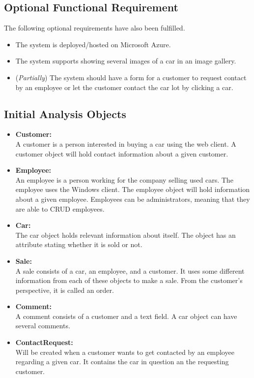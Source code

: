 \subsection{Optional Functional Requirement}
The following optional requirements have also been fulfilled.
\begin{itemize}
	\item The system is deployed/hosted on Microsoft Azure.
	\item The system supports showing several images of a car in an image gallery.
	\item (\textit{Partially}) The system should have a form for a customer to request contact by an employee or let the customer contact the car lot by clicking a car.
\end{itemize}

\subsection{Initial Analysis Objects}
\begin{itemize}
    \item \textbf{Customer:}\\
    A customer is a person interested in buying a car using the web client. A customer object will hold contact information about a given customer.
    \item \textbf{Employee:}\\
    An employee is a person working for the company selling used cars. The employee uses the Windows client. The employee object will hold information about a given employee. Employees can be administrators, meaning that they are able to CRUD employees.
    \item \textbf{Car:}\\
    The car object holds relevant information about itself. The object has an attribute stating whether it is sold or not.
    \item \textbf{Sale:}\\
    A sale consists of a car, an employee, and a customer. It uses some different information from each of these objects to make a sale. From the customer's perspective, it is called an order.
    \item \textbf{Comment:}\\
    A comment consists of a customer and a text field. A car object can have several comments.
    \item \textbf{ContactRequest:}\\
    Will be created when a customer wants to get contacted by an employee regarding a given car. It contains the car in question an the requesting customer.
\end{itemize}
